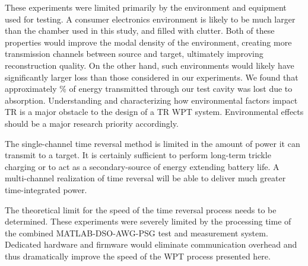 These experiments were limited primarily by the environment and equipment used
for testing.
%
A consumer electronics environment is likely to be much larger than the chamber
used in this study, and filled with clutter.
%
Both of these properties would improve the modal density of the environment,
creating more transmission channels between source and target, ultimately
improving reconstruction quality.
%
On the other hand, such environments would likely have significantly larger loss
than those considered in our experiments. We found that approximately \% of energy transmitted through our test cavity was lost due to absorption. Understanding and characterizing how environmental factors impact TR is a major obstacle to the design of a TR WPT system. Environmental effects should be a major research priority accordingly.


The single-channel time reversal method is limited in the amount of power it can
transmit to a target.
%
It is certainly sufficient to perform long-term trickle charging or to act as a
secondary-source of energy extending battery life.
%
A multi-channel realization of time reversal will be able to deliver much
greater time-integrated power.



The theoretical limit for the speed of the time reversal process needs to be
determined.
%
These experiments were severely limited by the processing time of the combined
MATLAB-DSO-AWG-PSG test and measurement system.
%
Dedicated hardware and firmware would eliminate communication overhead and thus
dramatically improve the speed of the WPT process presented here.
